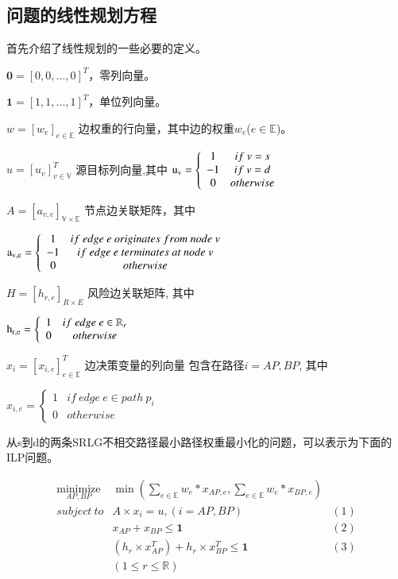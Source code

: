 \subsection{问题的线性规划方程}
首先介绍了线性规划的一些必要的定义。

$\textbf{0}=[0,0,\ldots,0]^T$，零列向量。

$\textbf{1}=[1,1,\ldots,1]^T$，单位列向量。


$w=[w_e]_{e\in \mathbb{E}}$ 边权重的行向量，其中边的权重$w_e$($e\in \mathbb{E}$)。

$u=[u_v]^T_{v\in \mathbb{V}}$ 源目标列向量,其中
${\rm{u_v}} = \left\{ {\begin{array}{*{20}{c}}
1&{if\ v = s}\\
{ - 1}&{if\ v = d}\\
0&{otherwise}
\end{array}} \right.$

$A=[a_{v,e}]_{\mathbb{V}\times \mathbb{E}}$ 节点边关联矩阵，其中

${\rm{a_{v,e}}} = \left\{ {\begin{array}{*{20}{c}}
1&{if\ edge\ e\ originates\ from\ node\ v}\\
{ - 1}&{if\ edge\ e\ terminates\ at\ node\ v}\\
0&{otherwise}
\end{array}} \right.$

$H=[h_{r,e}]_{R\times E}$ 风险边关联矩阵, 其中

${\rm{h_{r,e}}} = \left\{ {\begin{array}{*{20}{c}}
1&{if\ edge\ e \in \mathbb{R}_r}\\
0&{otherwise}
\end{array}} \right.$

$x_i=[x_{i,e}]^T_{e\in \mathbb{E}}$ 边决策变量的列向量 包含在路径$i=AP,BP$, 其中

${x_{i,e}} = \left\{ {\begin{array}{*{20}{c}}
1&{if\ edge\ e \in path\ p_i}\\
0&{otherwise}
\end{array}} \right.$


从s到d的两条SRLG不相交路径最小路径权重最小化的问题，可以表示为下面的ILP问题。

\begin{equation*}
\begin{array}{*{20}{c}}
   {\mathop {minimize}\limits_{AP,BP} } & {\min \left( {{\sum\limits_{e\in \mathbb{E}}w_e*x_{AP,e}},{\sum\limits_{e\in \mathbb{E}}w_e*x_{BP,e}}} \right)}\\
   {subject\ to} & A\times x_i=u,(i=AP,BP)& (1) \\
   {} & x_{AP}+x_{BP}\leq \textbf{1}& (2)\\
   {} & (h_{r}\times x_{AP}^T)+h_{r}\times x_{BP}^T \leq \textbf{1}& (3) \\
   {} & (1\leq r \leq \mathbb{R})
\end{array}
\label{eq:problem definition}
\end{equation*}



